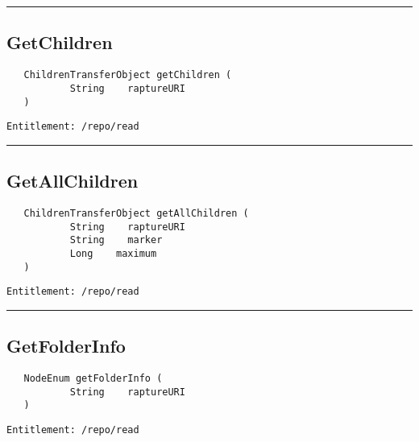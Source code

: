 \rule{12cm}{2pt}
\subsection{GetChildren}
\label{Api:GetChildren}
\begin{verbatim}
   ChildrenTransferObject getChildren (
           String    raptureURI
   )
\end{verbatim}
\begin{Verbatim}[fontsize=\small, formatcom=\color{Maroon}]
  Entitlement: /repo/read
\end{Verbatim}



\rule{12cm}{2pt}
\subsection{GetAllChildren}
\label{Api:GetAllChildren}
\begin{verbatim}
   ChildrenTransferObject getAllChildren (
           String    raptureURI
           String    marker
           Long    maximum
   )
\end{verbatim}
\begin{Verbatim}[fontsize=\small, formatcom=\color{Maroon}]
  Entitlement: /repo/read
\end{Verbatim}



\rule{12cm}{2pt}
\subsection{GetFolderInfo}
\label{Api:GetFolderInfo}
\begin{verbatim}
   NodeEnum getFolderInfo (
           String    raptureURI
   )
\end{verbatim}
\begin{Verbatim}[fontsize=\small, formatcom=\color{Maroon}]
  Entitlement: /repo/read
\end{Verbatim}



